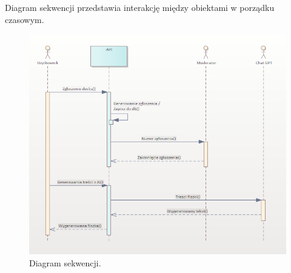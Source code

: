 \begin{minipage}{\textwidth}
\setlength{\parindent}{15pt}

\indent Diagram sekwencji przedstawia interakcję między obiektami w porządku czasowym.

    \begin{figure}[H]
    \centering
    \includegraphics[width=1\textwidth]{chapters/chapter_6/diagram_sekwencji}
    \caption{Diagram sekwencji.}
    \label{img:diagram_sekwencji}
\end{figure}


\end{minipage}

    


